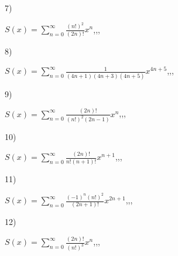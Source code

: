 \documentclass[11pt, ukrainian]{article}
\begin{document}
\par
\vspace{0.9cm}
7) \space 
{%
{$S(x)=\sum\limits_{n=0}^{\infty}{\frac{(n!)^2}{(2n)!}}{x^{{n}}}$},,, \par \smallskip  
}
\par
\vspace{0.9cm}
8) \space 
{%
{$S(x)=\sum\limits_{n=0}^{\infty}{\frac{1}{(4n+1)(4n+3)(4n+5)}}{x^{{4n+5}}}$},,, \par \smallskip  
}
\par
\vspace{0.9cm}
9) \space 
{%
{$S(x)=\sum\limits_{n=0}^{\infty}{\frac{(2n)!}{(n!)^2(2n-1)}}{x^{n}}$},,, \par \smallskip  
}
\par
\vspace{0.9cm}
10) \space 
{%
{$S(x)=\sum\limits_{n=0}^{\infty}{\frac{(2n)!}{n!(n+1)!}}{x^{{n+1}}}$},,, \par \smallskip  
}
\par
\newpage
11) \space 
{%
{$S(x)=\sum\limits_{n=0}^{\infty}{\frac{{(-1)^n}{(n!)^2}}{(2n+1)!}}{x^{{2n+1}}}$},,, \par \smallskip  
}
\par
\vspace{0.9cm}
12) \space 
{%
{$S(x)=\sum\limits_{n=0}^{\infty}{\frac{(2n)!}{(n!)^3}}{x^{{n}}}$},,, \par \smallskip  
}
\end{document}
